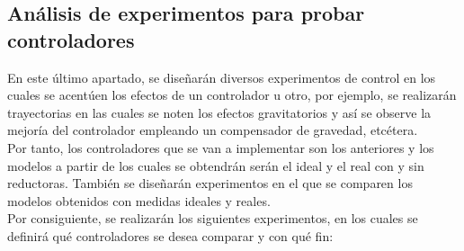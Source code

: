 \newpage

\subsection{Análisis de experimentos para probar controladores}

En este último apartado, se diseñarán diversos experimentos de control en los cuales se acentúen los efectos de un controlador u otro, por ejemplo, se realizarán trayectorias en las cuales se noten los efectos gravitatorios y así se observe la mejoría del controlador empleando un compensador de gravedad, etcétera.\\

Por tanto, los controladores que se van a implementar son los anteriores y los modelos a partir de los cuales se obtendrán serán el ideal y el real con y sin reductoras. También se diseñarán experimentos en el que se comparen los modelos obtenidos con medidas ideales y reales.\\



Por consiguiente, se realizarán los siguientes experimentos, en los cuales se definirá qué controladores se desea comparar y con qué fin:

